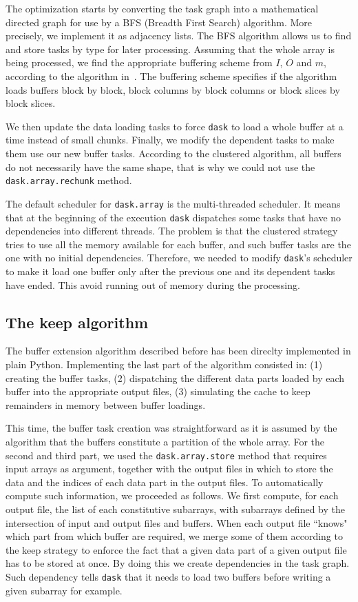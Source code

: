 \documentclass[conference]{IEEEtran}
\begin{document}
The optimization starts by converting the task graph into a mathematical
directed graph for use by a BFS (Breadth First Search) algorithm. More
precisely, we implement it as adjacency lists. The BFS algorithm allows us to
find and store tasks by type for later processing. Assuming that the whole array
is being processed, we find the appropriate buffering scheme from $I$, $O$ and
$m$, according to the algorithm in~\cite{seqalgorithms}. The buffering scheme
specifies if the algorithm loads buffers block by block, block columns by
block columns or block slices by block slices.

We then update the data loading tasks to force \texttt{dask} to load a whole buffer at
a time instead of small chunks. Finally, we modify the dependent tasks to make
them use our new buffer tasks. According to the clustered algorithm, all buffers
do not necessarily have the same shape, that is why we could not use the
\texttt{dask.array.rechunk} method.

The default scheduler for \texttt{dask.array} is the multi-threaded scheduler. It means
that at the beginning of the execution \texttt{dask} dispatches some tasks that have
no dependencies into different threads. The problem is that the clustered
strategy tries to use all the memory available for each buffer, and such buffer
tasks are the one with no initial dependencies. Therefore, we needed to
modify \texttt{dask}'s scheduler to make it load one buffer only after the previous one
and its dependent tasks have ended. This avoid running out of memory during the
processing.

\subsection{The keep algorithm}

The buffer extension algorithm described before has been direclty
implemented in plain Python. Implementing the last part of the algorithm
consisted in: (1) creating the buffer tasks, (2) dispatching the different data
parts loaded by each buffer into the appropriate output files, (3) simulating
the cache to keep remainders in memory between buffer loadings.

This time, the buffer task creation was straightforward as it is assumed by the
algorithm that the buffers constitute a partition of the whole array. For the
second and third part, we used the \texttt{dask.array.store} method that
requires input arrays as argument, together with the output files in which to
store the data and the indices of each data part in the output files. To
automatically compute such information, we proceeded as follows. We first
compute, for each output file, the list of each constitutive subarrays, with
subarrays defined by the intersection of input and output files and buffers.
When each output file ``knows" which part from which buffer are required, we
merge some of them according to the keep strategy to enforce the fact that
a given data part of a given output file has to be stored at once. By doing this
we create dependencies in the task graph. Such dependency tells \texttt{dask} that it
needs to load two buffers before writing a given subarray for example.
\end{document}
